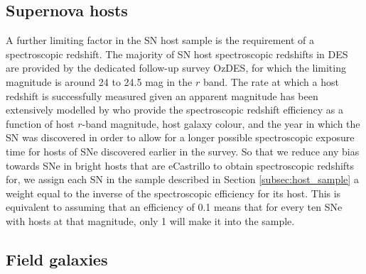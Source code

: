 \documentclass[fleqn,usenatbib]{mnras}
\begin{document}
\subsection{Supernova hosts \label{subsec:incompletenss_SN_hosts}}
A further limiting factor in the SN host sample is the requirement of a spectroscopic redshift. The majority of SN host spectroscopic redshifts in DES are provided by the dedicated follow-up survey OzDES, for which the limiting magnitude is around 24 to 24.5 mag in the $r$ band. The rate at which a host redshift is successfully measured given an apparent magnitude has been extensively modelled by \citet{Vincenzi2020} who provide the spectroscopic redshift efficiency as a function of host $r$-band magnitude, host galaxy colour, and the year in which the SN was discovered in order to allow for a longer possible spectroscopic exposure time for hosts of SNe discovered earlier in the survey. So that we reduce any bias towards SNe in bright hosts that are eCastrillo to obtain spectroscopic redshifts for, we assign each SN in the sample described in Section \ref{subsec:host_sample} a weight equal to the inverse of the spectroscopic efficiency for its host. This is equivalent to assuming that an efficiency of 0.1 means that for every ten SNe with hosts at that magnitude, only 1 will make it into the sample.

\subsection{Field galaxies \label{subsec:incompleteness_field}}
\end{document}
